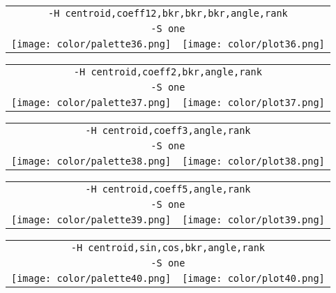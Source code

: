 \documentclass{article}
\begin{document}
\begin{center}
\begin{tabular}{m{8cm}m{8cm}}
\multicolumn{2}{c}{\tt -H centroid,coeff12,bkr,bkr,bkr,angle,rank} \\
\multicolumn{2}{c}{\tt -S one} \\
\texttt{[image: color/palette36.png]} &
\texttt{[image: color/plot36.png]}
\end{tabular}
\end{center}

\begin{center}
\begin{tabular}{m{8cm}m{8cm}}
\multicolumn{2}{c}{\tt -H centroid,coeff2,bkr,angle,rank} \\
\multicolumn{2}{c}{\tt -S one} \\
\texttt{[image: color/palette37.png]} &
\texttt{[image: color/plot37.png]}
\end{tabular}
\end{center}

\begin{center}
\begin{tabular}{m{8cm}m{8cm}}
\multicolumn{2}{c}{\tt -H centroid,coeff3,angle,rank} \\
\multicolumn{2}{c}{\tt -S one} \\
\texttt{[image: color/palette38.png]} &
\texttt{[image: color/plot38.png]}
\end{tabular}
\end{center}

\begin{center}
\begin{tabular}{m{8cm}m{8cm}}
\multicolumn{2}{c}{\tt -H centroid,coeff5,angle,rank} \\
\multicolumn{2}{c}{\tt -S one} \\
\texttt{[image: color/palette39.png]} &
\texttt{[image: color/plot39.png]}
\end{tabular}
\end{center}

\begin{center}
\begin{tabular}{m{8cm}m{8cm}}
\multicolumn{2}{c}{\tt -H centroid,sin,cos,bkr,angle,rank} \\
\multicolumn{2}{c}{\tt -S one} \\
\texttt{[image: color/palette40.png]} &
\texttt{[image: color/plot40.png]}
\end{tabular}
\end{center}
\end{document}
